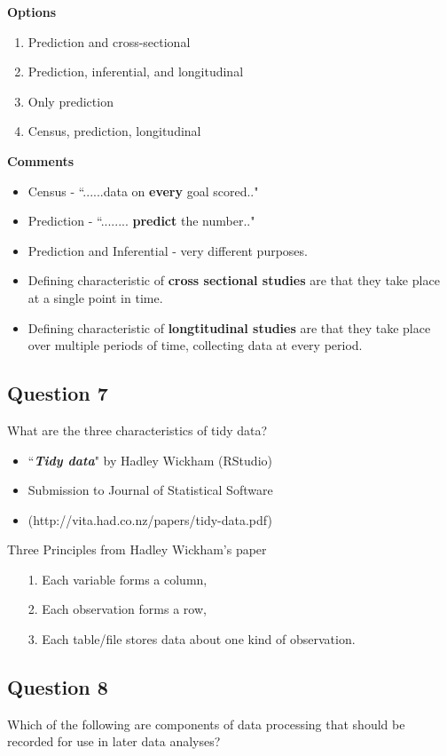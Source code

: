 \documentclass[]{article}
\begin{document}
\textbf{Options}
\begin{enumerate}
\item Prediction and cross-sectional
\item Prediction, inferential, and longitudinal
\item Only prediction
\item Census, prediction, longitudinal
\end{enumerate}

\textbf{Comments}
\begin{itemize}
\item Census - ``......data on \textbf{every} goal scored.."
\item Prediction - ``........ \textbf{predict} the number.."
\item Prediction and Inferential - very different purposes. 
\item Defining characteristic of \textbf{cross sectional studies} are that they take place at a single point in time.
\item Defining characteristic of \textbf{longtitudinal studies} are that they take place over multiple periods of time, collecting data at every period.
\end{itemize}
\newpage
\subsection*{Question 7}
What are the three characteristics of tidy data?

\begin{itemize}
\item ``\textit{\textbf{Tidy data}}" by Hadley Wickham (RStudio)
\item Submission to Journal of Statistical Software
\item (http://vita.had.co.nz/papers/tidy-data.pdf)
\end{itemize}
Three Principles from Hadley Wickham's paper
\begin{itemize}
\item[1.] Each variable forms a column, 
\item[2.] Each observation forms a row, 
\item[3.] Each table/file stores data about one kind of observation.
\end{itemize}
\newpage
\subsection*{Question 8}
Which of the following are components of data processing that should be recorded for use in later data analyses?
\end{document}
